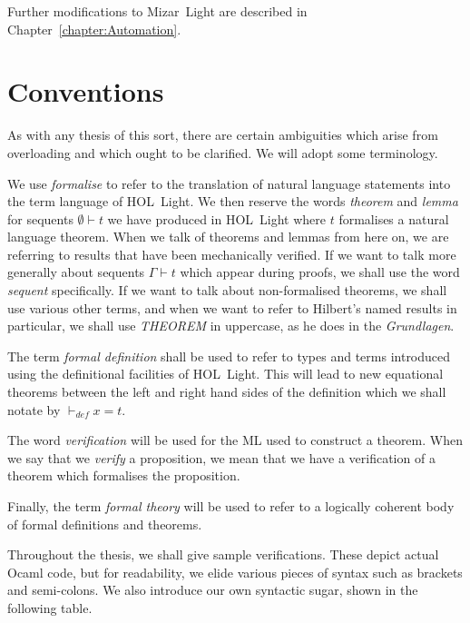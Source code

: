 Further modifications to Mizar~Light are described in Chapter~\ref{chapter:Automation}.

\section{Conventions}\label{sec:Conventions}
As with any thesis of this sort, there are certain ambiguities which arise from overloading and which ought to be clarified. We will adopt some terminology.

We use \emph{formalise} to refer to the translation of natural language statements into the term language of HOL~Light. We then reserve the words \emph{theorem} and \emph{lemma} for sequents $\emptyset \vdash t$ we have produced in HOL~Light where $t$ formalises a natural language theorem. When we talk of theorems and lemmas from here on, we are referring to results that have been mechanically verified. If we want to talk more generally about sequents $\Gamma\vdash t$ which appear during proofs, we shall use the word \emph{sequent} specifically. If we want to talk about non-formalised theorems, we shall use various other terms, and when we want to refer to Hilbert's named results in particular, we shall use \emph{THEOREM} in uppercase, as he does in the \emph{Grundlagen}.

The term \emph{formal definition} shall be used to refer to types and terms introduced using the definitional facilities of HOL~Light. This will lead to new equational theorems between the left and right hand sides of the definition which we shall notate by $\vdash_{def} x = t$.

The word \emph{verification}  will be used for the ML used to construct a theorem. When we say that we \emph{verify} a proposition, we mean that we have a verification of a theorem which formalises the proposition.

Finally, the term \emph{formal theory} will be used to refer to a logically coherent body of formal definitions and theorems.

Throughout the thesis, we shall give sample verifications. These depict actual Ocaml code, but for readability, we elide various pieces of syntax such as brackets and semi-colons. We also introduce our own syntactic sugar, shown in the following table.

